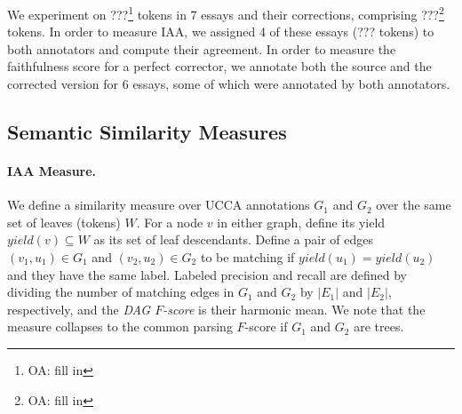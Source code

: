 \documentclass[letterpaper, 11pt]{article}
\newcommand{\oa}[1]{\footnote{\color{red}OA: #1}}
\begin{document}
We experiment on ???\oa{fill in} tokens in 7 essays and their corrections, comprising ???\oa{fill in} tokens. 
In order to measure IAA, we assigned 4 of these essays (??? tokens) to both annotators
and compute their agreement.
In order to measure the faithfulness score for a perfect corrector, we annotate both the source
and the corrected version for 6 essays, some of which were annotated by both annotators.

%
%
%
%
%
\subsection{Semantic Similarity Measures}
\paragraph{IAA Measure.} We define a similarity measure over UCCA annotations 
$G_1$ and $G_2$ over the same set of leaves (tokens) $W$.
For a node $v$ in either graph, define its yield $yield(v) \subseteq W$ as its
set of leaf descendants.
Define a pair of edges $(v_1,u_1) \in G_1$ and $(v_2,u_2) \in G_2$ to be matching
if $yield(u_1) = yield(u_2)$ and they have the same label.
Labeled precision and recall are defined by dividing the number of matching edges
in $G_1$ and $G_2$ by $|E_1|$ and $|E_2|$, respectively, and
the {\it DAG $F$-score} is their harmonic mean.
We note that the measure collapses to the common parsing $F$-score if $G_1$ and $G_2$ are trees.
\end{document}
